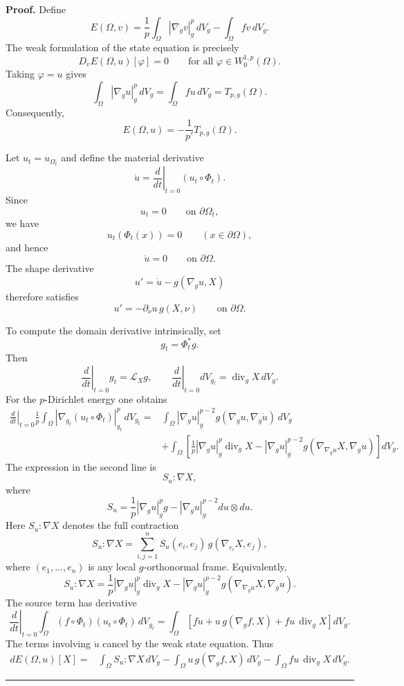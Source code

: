 \documentclass{article}
\newenvironment{proof}[1][Proof]{\textbf{#1.} }{\hfill\rule{0.5em}{0.5em}}
\begin{document}
\begin{proof}
Define
\[
E(\Omega,v)
=
\frac1p\int_\Omega|\nabla_gv|_g^p\,dV_g
-
\int_\Omega fv\,dV_g.
\]
The weak formulation of the state equation is precisely
\[
D_vE(\Omega,u)[\varphi]=0
\qquad
\text{for all }\varphi\in W_0^{1,p}(\Omega).
\]
Taking $\varphi=u$ gives
\begin{equation}
\int_\Omega|\nabla_g u|_g^p\,dV_g
=
\int_\Omega fu\,dV_g
=
T_{p,g}(\Omega).
\label{eq:torsion-energy-identity}
\end{equation}
Consequently,
\begin{equation}
E(\Omega,u)
=
-\frac1{p'}T_{p,g}(\Omega).
\label{eq:energy-torsion-relation}
\end{equation}

Let $u_t=u_{\Omega_t}$ and define the material derivative
\[
\dot u
=
\left.
\frac{d}{dt}
\right|_{t=0}
(u_t\circ\Phi_t).
\]
Since
\[
u_t=0\qquad\text{on }\partial\Omega_t,
\]
we have
\[
u_t(\Phi_t(x))=0
\qquad (x\in\partial\Omega),
\]
and hence
\[
\dot u=0
\qquad\text{on }\partial\Omega.
\]
The shape derivative
\[
u'=\dot u-g(\nabla_g u,X)
\]
therefore satisfies
\[
u'
=
-\partial_\nu u\,g(X,\nu)
\qquad\text{on }\partial\Omega.
\]

To compute the domain derivative intrinsically, set
\[
g_t=\Phi_t^*g.
\]
Then
\[
\left.\frac{d}{dt}\right|_{t=0}g_t
=
\mathcal L_Xg,
\qquad
\left.\frac{d}{dt}\right|_{t=0}dV_{g_t}
=
\operatorname{div}_gX\,dV_g.
\]
For the $p$-Dirichlet energy one obtains
\begin{align}
\left.
\frac{d}{dt}
\right|_{t=0}
\frac1p
\int_\Omega
|\nabla_{g_t}(u_t\circ\Phi_t)|_{g_t}^p\,dV_{g_t}
={}&
\int_\Omega
|\nabla_g u|_g^{p-2}
g(\nabla_g u,\nabla_g\dot u)\,dV_g
\nonumber\\
&+
\int_\Omega
\left[
\frac1p|\nabla_g u|_g^p\operatorname{div}_gX
-
|\nabla_g u|_g^{p-2}
g(\nabla_{\nabla_g u}X,\nabla_g u)
\right]dV_g.
\label{eq:transport-p-energy}
\end{align}
The expression in the second line is
\[
S_u:\nabla X,
\]
where
\begin{equation}
S_u
=
\frac1p|\nabla_g u|_g^p g
-
|\nabla_g u|_g^{p-2}du\otimes du.
\label{eq:stress-tensor-p}
\end{equation}
Here $S_u:\nabla X$ denotes the full contraction
\[
S_u:\nabla X
=
\sum_{i,j=1}^n
S_u(e_i,e_j)\,
g(\nabla_{e_i}X,e_j),
\]
where $(e_1,\ldots,e_n)$ is any local $g$-orthonormal frame.
Equivalently,
\[
S_u:\nabla X
=
\frac1p|\nabla_g u|_g^p\operatorname{div}_g X
-
|\nabla_g u|_g^{p-2}
g(\nabla_{\nabla_g u}X,\nabla_g u).
\]
The source term has derivative
\[
\left.
\frac{d}{dt}
\right|_{t=0}
\int_\Omega
(f\circ\Phi_t)(u_t\circ\Phi_t)\,dV_{g_t}
=
\int_\Omega
\left[
f\dot u
+
u\,g(\nabla_gf,X)
+
fu\,\operatorname{div}_gX
\right]dV_g.
\]
The terms involving $\dot u$ cancel by the weak state equation.
Thus
\begin{align}
dE(\Omega,u)[X]
={}&
\int_\Omega S_u:\nabla X\,dV_g
-
\int_\Omega
u\,g(\nabla_gf,X)\,dV_g
-
\int_\Omega
fu\,\operatorname{div}_gX\,dV_g.
\label{eq:energy-shape-reduced}
\end{align}


\end{proof}
\end{document}
